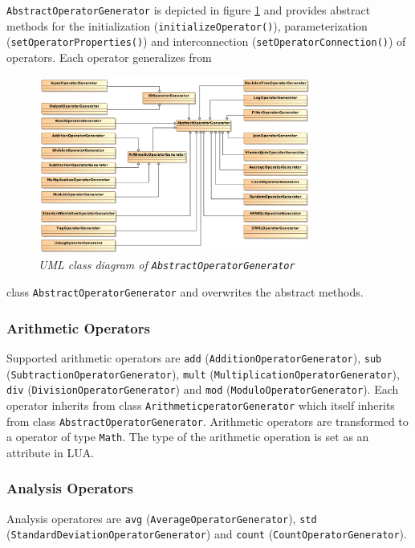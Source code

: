 \texttt{AbstractOperatorGenerator} is depicted in figure 
\ref{fig:abstractoperatorgenerator} and provides abstract methods for the 
initialization (\texttt{initializeOperator()}), parameterization 
(\texttt{setOperatorProperties()}) and interconnection 
(\texttt{setOperatorConnection()}) of operators. Each operator generalizes from
\begin{figure}[htpb]
  \centering
  \includegraphics[width=0.8\textwidth]{figures/overview}
  \caption{\emph{UML class diagram of \texttt{AbstractOperatorGenerator}}}
  \label{fig:abstractoperatorgenerator}
\end{figure}
class \texttt{AbstractOperatorGenerator} and overwrites the abstract methods.

\subsubsection{Arithmetic Operators}
Supported arithmetic operators are \texttt{add} 
(\texttt{AdditionOperatorGenerator}), \texttt{sub} 
(\texttt{Subtraction\-OperatorGenerator}), \texttt{mult} 
(\texttt{MultiplicationOperatorGenerator}), \texttt{div} 
(\texttt{DivisionOperator\-Generator}) and \texttt{mod} 
(\texttt{ModuloOperatorGenerator}). Each operator inherits from class 
\texttt{Arithm\-eticperatorGenerator} which itself inherits from class
\texttt{AbstractOperatorGenerator}. Arithmetic operators are transformed to a
operator of type \texttt{Math}. The type of the arithmetic operation is set
as an attribute in LUA.

\subsubsection{Analysis Operators}
Analysis operatores are \texttt{avg} (\texttt{AverageOperatorGenerator}), 
\texttt{std} (\texttt{StandardDeviationOperatorGenerator}) and \texttt{count}
(\texttt{CountOperatorGenerator}).

